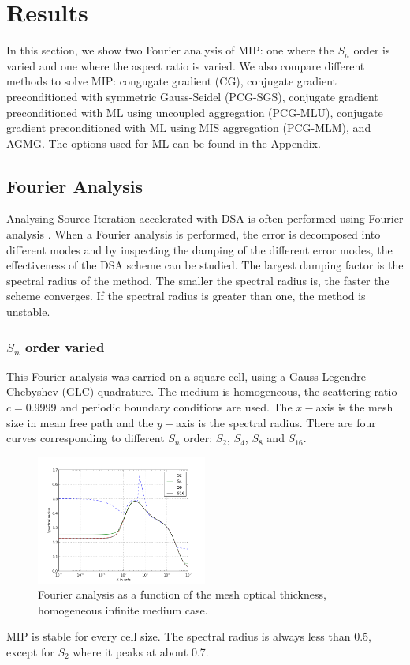 \section{Results} \label{sec_res}
In this section, we show two Fourier analysis of MIP: one where the $S_n$ order is
varied and one where the aspect ratio is varied. We also compare different
methods to solve MIP: congugate gradient (CG), conjugate gradient
preconditioned with symmetric Gauss-Seidel (PCG-SGS), conjugate gradient
preconditioned with ML using uncoupled aggregation (PCG-MLU),
conjugate gradient preconditioned with ML using MIS aggregation (PCG-MLM),
and AGMG. The options used for ML can be found in the Appendix.
\subsection{Fourier Analysis}
Analysing Source Iteration accelerated with DSA is often performed using
Fourier analysis \cite{larsen_dsa,consistent_p1}. When a Fourier analysis is
performed, the error is decomposed into different modes and by inspecting the 
damping of the different error modes, the effectiveness of the DSA scheme can 
be studied. The largest damping factor is the spectral radius of the method. 
The smaller the spectral radius is, the faster the scheme converges. If the 
spectral radius is greater than one, the method is unstable. 
\subsubsection{$S_n$ order varied}
This Fourier analysis was carried on a square cell, using a
Gauss-Legendre-Chebyshev (GLC) quadrature. The medium is homogeneous, the scattering
ratio $c=0.9999$ and periodic boundary conditions are used. The $x-$axis is the mesh
size in mean free path and the $y-$axis is the spectral radius. There are four
curves corresponding to different $S_n$ order: $S_2$, $S_4$, $S_8$ and
$S_{16}$.
\begin{figure}[H]
\centering
\includegraphics[width=0.5\textwidth]{./Dsa/sn_order_9999}
\caption{Fourier analysis as a function of the mesh optical thickness,
homogeneous infinite medium case.}
\end{figure}
MIP is stable for every cell size. The spectral radius is always less than
0.5, except for $S_2$ where it peaks at about 0.7.
